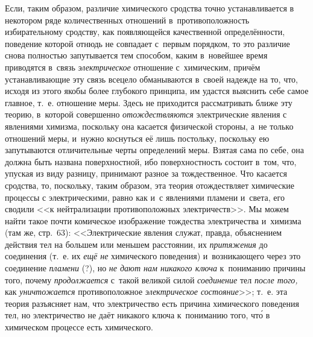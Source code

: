 Если, таким образом, различие химического сродства точно устанавливается в
некотором ряде количественных отношений в~противоположность избирательному
сродству, как появляющейся качественной определённости, поведение которой отнюдь не совпадает с~первым
порядком, то это различие снова полностью запутывается тем способом, каким
в~новейшее время приводятся в~связь {\em электрическое} отношение с~химическим,
причём устанавливающие эту связь всецело обманываются в~своей надежде на то,
что, исходя из этого якобы более глубокого принципа, им удастся выяснить себе
самое главное, т.~е. отношение меры. Здесь не приходится рассматривать ближе
эту теорию, в~которой совершенно {\em отождествляются} электрические явления с
явлениями химизма, поскольку она касается физической стороны, а~не только
отношений меры, и~нужно коснуться её лишь постольку, поскольку ею запутываются
отличительные черты определений меры. Взятая сама по себе, она должна быть
названа поверхностной, ибо поверхностность состоит в~том, что, упуская из виду
разницу, принимают разное за тождественное. Что касается сродства, то,
поскольку, таким образом, эта теория отождествляет химические процессы с
электрическими, равно как и~с явлениями пламени и~света, его сводили <<к
нейтрализации противоположных электричеств>>. Мы можем найти такое почти
комическое изображение тождества электричества и~химизма (там же, стр.~63):
<<Электрические явления служат, правда, объяснением действия тел на большем или
меньшем расстоянии, их {\em притяжения} до соединения (т.~е. их {\em ещё не}
химического поведения) и~возникающего через это соединение {\em пламени} (?),
но {\em не дают нам никакого ключа} к~пониманию причины того, почему
{\em продолжается} с~такой великой силой {\em соединение} тел {\em после того,}
как {\em уничтожается} противоположное {\em электрическое состояние}>>; т.~е.
эта теория разъясняет нам, что электричество есть причина химического поведения
тел, но электричество не даёт никакого ключа к~пониманию того, чт\'{о}
в химическом процессе есть химического.

